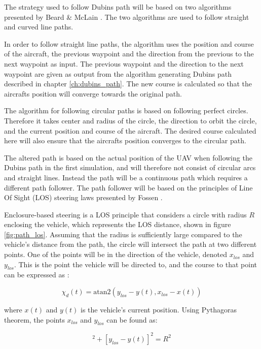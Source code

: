 The strategy used to follow Dubins path will be based on two algorithms presented by Beard \& McLain \cite{suaBEARD}. The two algorithms are used to follow straight and curved line paths.

In order to follow straight line paths, the algorithm uses the position and course of the aircraft, the previous waypoint and the direction from the previous to the next waypoint as input. The previous waypoint and the direction to the next waypoint are given as output from the algorithm generating Dubins path described in chapter \ref{ch:dubins_path}. The new course is calculated so that the aircrafts position will converge towards the original path.

The algorithm for following circular paths is based on following perfect circles. Therefore it takes center and radius of the circle, the direction to orbit the circle, and the current position and course of the aircraft. The desired course calculated here will also ensure that the aircrafts position converges to the circular path.

The altered path is based on the actual position of the UAV when following the Dubins path in the first simulation, and will therefore not consist of circular arcs and straight lines. Instead the path will be a continuous path which requires a different path follower. The path follower will be based on the principles of Line Of Sight (LOS) steering laws presented by Fossen \cite{fartoyFOSSEN}.

Enclosure-based steering is a LOS principle that considers a circle with radius $R$ enclosing the vehicle, which represents the LOS distance, shown in figure \ref{fig:path_los}. Assuming that the radius is sufficiently large compared to the vehicle's distance from the path, the circle will intersect the path at two different points. One of the points will be in the direction of the vehicle, denoted $x_{los}$ and $y_{los}$. This is the point the vehicle will be directed to, and the course to that point can be expressed as \cite{fartoyFOSSEN}:

\begin{equation}
	\chi_d(t) = \text{atan2}(y_{los} - y(t), x_{los} - x(t))
\end{equation}

where $x(t)$ and $y(t)$ is the vehicle's current position. Using Pythagoras theorem, the points $x_{los}$ and $y_{los}$ can be found as:

\begin{equation}
	[x_{los} - x(t)]^2 + [y_{los} - y(t)]^2 = R^2
\end{equation}

